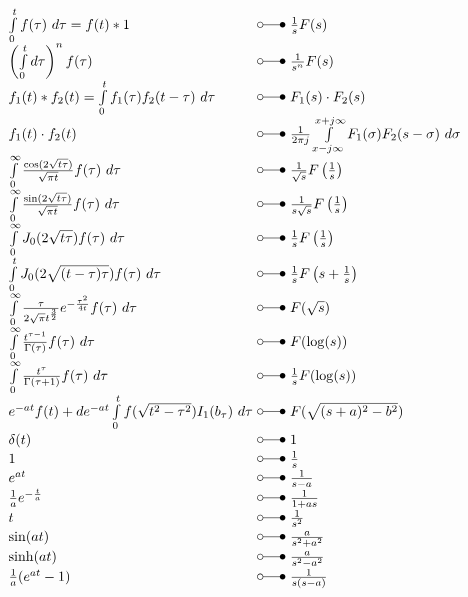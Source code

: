 \begin{footnotesize}
\[ \begin{array}{@{}l@{ ~ \laplace ~ }l@{}}
\int\limits_0^t f(\tau) ~ d \tau = f(t) * 1 &
    \frac{1}{s} F(s) \\
\left(\int\limits_0^t d\tau\right)^n f(\tau) &
    \frac{1}{s^n} F(s) \\
f_1(t) * f_2(t) = \int\limits_0^t f_1(\tau) f_2(t - \tau) ~ d \tau &
    F_1(s) \cdot F_2(s) \\
f_1(t) \cdot f_2(t) &
    \frac{1}{2 \pi j} \int\limits_{x-j\infty}^{x+j\infty} F_1(\sigma) F_2(s - \sigma) ~ d\sigma \\
\int\limits_0^\infty \frac{\cos(2 \sqrt{t \tau})}{\sqrt{\pi t}} f(\tau) ~ d\tau &
    \frac{1}{\sqrt{s}} F\left(\frac{1}{s}\right) \\
\int\limits_0^\infty \frac{\sin(2 \sqrt{t \tau})}{\sqrt{\pi t}} f(\tau) ~ d\tau &
    \frac{1}{s\sqrt{s}} F\left(\frac{1}{s}\right) \\
\int\limits_0^\infty J_0(2 \sqrt{t \tau}) f(\tau) ~ d\tau &
    \frac{1}{s} F\left(\frac{1}{s}\right) \\
\int\limits_0^t J_0(2 \sqrt{(t - \tau)\tau}) f(\tau) ~ d\tau &
    \frac{1}{s} F\left(s + \frac{1}{s}\right) \\
\int\limits_0^\infty \frac{\tau}{2 \sqrt{\pi} t^{\frac{3}{2}}} e^{-\frac{\tau^2}{4 t}} f(\tau) ~ d\tau &
    F(\sqrt{s}) \\
\int\limits_0^\infty \frac{t^{\tau - 1}}{\Gamma(\tau)} f(\tau) ~ d\tau &
    F(\log(s)) \\
\int\limits_0^\infty \frac{t^\tau}{\Gamma(\tau + 1)} f(\tau) ~d\tau &
    \frac{1}{s} F(\log(s)) \\
e^{-at} f(t) + d e^{-at} \int\limits_0^t f(\sqrt{t^2 - \tau^2}) I_1(b_\tau) ~ d\tau &
    F(\sqrt{(s + a)^2 - b^2}) \\
\delta(t) &
    1 \\
1 &
    \frac{1}{s} \\
e^{at} &
    \frac{1}{s - a} \\
\frac{1}{a} e^{-\frac{t}{a}} &
    \frac{1}{1 + as} \\
t &
    \frac{1}{s^2} \\
\sin(at) &
    \frac{a}{s^2 + a^2} \\
\sinh(at) &
    \frac{a}{s^2 - a^2} \\
\frac{1}{a} (e^{at} - 1) &
\frac{1}{s (s - a)} \\
\end{array} \]


\end{footnotesize}
